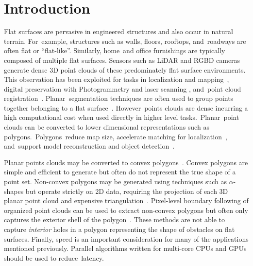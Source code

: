 \section{Introduction}
Flat surfaces are pervasive in engineered structures and also occur in natural terrain. For~example, structures such as walls, floors, rooftops, and~roadways are often flat or ``flat-like''. Similarly, home~and office furnishings are typically composed of multiple flat surfaces. Sensors such as LiDAR and \ac{RGBD} cameras generate dense 3D point clouds of these predominately flat surface environments. This observation has been exploited for tasks in localization and mapping~\cite{pathak_online_2010}, digital preservation with Photogrammetry and laser scanning \cite{malihi_3d_2016, lerma_terrestrial_2010, balsa-barreiro_generation_2018}, and~point cloud registration~\cite{rusinkiewicz_efficient_2001}. Planar~segmentation techniques are often used to group points together belonging to a flat surface~\cite{feng_fast_2014, pham_geometrically_2016-1, schaefer_maximum_2019}. However~points clouds are dense incurring a high computational cost when used directly in higher level tasks.~Planar~point clouds can be converted to lower dimensional representations such as polygons.~Polygons~reduce map size, accelerate matching for localization~\cite{lee_indoor_2012-1}, and~support model reconstruction and object detection~\cite{cao_roof_2017}. 

Planar points clouds may be converted to convex polygons~\cite{biswas_planar_2012}. Convex polygons are simple and efficient to generate but often do not represent the true shape of a point set. Non-convex polygons may be generated using techniques such as $\alpha$-shapes but operate strictly on 2D data, requiring the projection of each 3D planar point cloud and expensive triangulation~\cite{lee_fast_2013, edelsbrunner_shape_1983}. Pixel-level boundary following of organized point clouds can be used to extract non-convex polygons but often only captures the exterior shell of the polygon~\cite{lee_indoor_2012-1}. These methods are not able to capture \emph{interior} holes in a polygon representing the shape of obstacles on flat surfaces. Finally, speed is an important consideration for many of the applications mentioned previously. Parallel algorithms written for multi-core CPUs and GPUs should be used to reduce~latency. 

